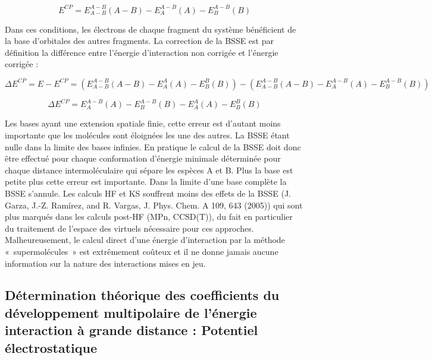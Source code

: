 \begin{equation}
E^{CP} = E_{A-B}^{A-B}(A-B) - E_{A}^{A-B}(A) - E_{B}^{A-B}(B)
\end{equation}

Dans ces conditions, les électrons de chaque fragment du système bénéficient de la base d'orbitales des autres fragments. La correction de la BSSE est par définition la différence entre l'énergie d'interaction non corrigée et l'énergie corrigée :

\begin{equation}
\Delta E^{CP} = E - E^{CP} = (E_{A-B}^{A-B}(A-B) - E_{A}^{A}(A) - E_{B}^{B}(B)) - (E_{A-B}^{A-B}(A-B) - E_{A}^{A-B}(A) - E_{B}^{A-B}(B))
\end{equation}

\begin{equation}
\Delta E^{CP} =  E_{A}^{A-B}(A) - E_{B}^{A-B}(B) - E_{A}^{A}(A) - E_{B}^{B}(B)
\end{equation}

Les bases ayant une extension spatiale finie, cette erreur est d'autant moins importante que les molécules sont éloignées les une des autres. La BSSE étant nulle dans la limite des bases infinies. En pratique le calcul de la BSSE doit donc être effectué pour chaque conformation d’énergie minimale déterminée pour chaque distance intermoléculaire qui sépare les espèces A et B. Plus la base est petite plus cette erreur est importante. Dans la limite d’une base complète la BSSE s’annule.
Les calculs HF et KS souffrent moins des effets de la BSSE (J. Garza, J.-Z. Ramírez, and R. Vargas, J. Phys. Chem. A 109, 643 (2005))
qui sont plus marqués dans les calculs post-HF (MPn, CCSD(T)), du fait en particulier du traitement de l’espace des virtuels nécessaire pour ces approches.\\


Malheureusement, le calcul direct d’une énergie d’interaction par la méthode « supermolécules » est extrêmement coûteux et il ne donne jamais aucune information sur la nature des interactions mises en jeu.\\



\subsection{Détermination théorique des coefficients du développement multipolaire de l’énergie interaction à grande distance : Potentiel électrostatique}


